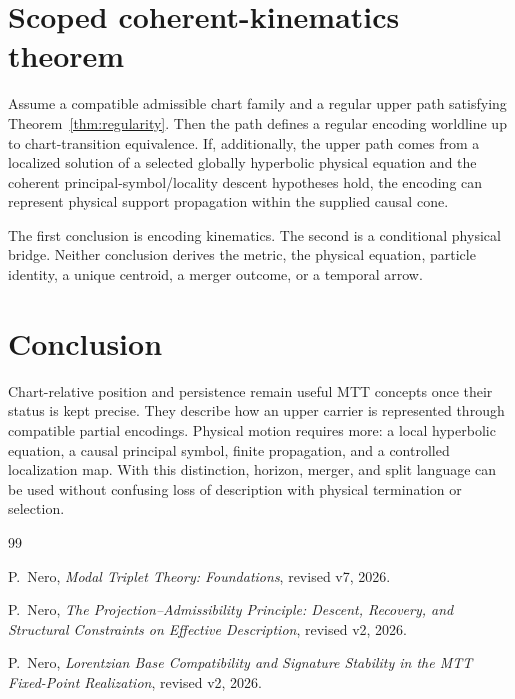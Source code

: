 \documentclass[11pt]{article}
\begin{document}
\section{Scoped coherent-kinematics theorem}

\begin{theorem}\label{thm:scope}
Assume a compatible admissible chart family and a regular upper path satisfying
Theorem~\ref{thm:regularity}. Then the path defines a regular encoding
worldline up to chart-transition equivalence. If, additionally, the upper path
comes from a localized solution of a selected globally hyperbolic physical
equation and the coherent principal-symbol/locality descent hypotheses hold,
the encoding can represent physical support propagation within the supplied
causal cone.
\end{theorem}

The first conclusion is encoding kinematics. The second is a conditional
physical bridge. Neither conclusion derives the metric, the physical equation,
particle identity, a unique centroid, a merger outcome, or a temporal arrow.

\section{Conclusion}

Chart-relative position and persistence remain useful MTT concepts once their
status is kept precise. They describe how an upper carrier is represented
through compatible partial encodings. Physical motion requires more: a local
hyperbolic equation, a causal principal symbol, finite propagation, and a
controlled localization map. With this distinction, horizon, merger, and split
language can be used without confusing loss of description with physical
termination or selection.

\begin{thebibliography}{99}

P.~Nero,
\newblock \emph{Modal Triplet Theory: Foundations}, revised v7, 2026.

P.~Nero,
\newblock \emph{The Projection--Admissibility Principle: Descent, Recovery,
and Structural Constraints on Effective Description}, revised v2, 2026.

P.~Nero,
\newblock \emph{Lorentzian Base Compatibility and Signature Stability in the
MTT Fixed-Point Realization}, revised v2, 2026.

\end{thebibliography}
\end{document}
